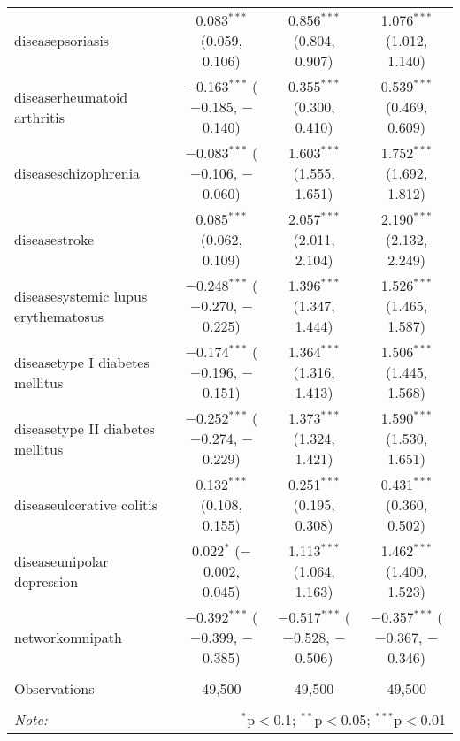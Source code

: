 \begin{table}[!htbp]
\begin{tabular}{@{\extracolsep{5pt}}lccc}
  diseasepsoriasis & 0.083$^{***}$ (0.059, 0.106) & 0.856$^{***}$ (0.804, 0.907) & 1.076$^{***}$ (1.012, 1.140) \\ 
  diseaserheumatoid arthritis & $-$0.163$^{***}$ ($-$0.185, $-$0.140) & 0.355$^{***}$ (0.300, 0.410) & 0.539$^{***}$ (0.469, 0.609) \\ 
  diseaseschizophrenia & $-$0.083$^{***}$ ($-$0.106, $-$0.060) & 1.603$^{***}$ (1.555, 1.651) & 1.752$^{***}$ (1.692, 1.812) \\ 
  diseasestroke & 0.085$^{***}$ (0.062, 0.109) & 2.057$^{***}$ (2.011, 2.104) & 2.190$^{***}$ (2.132, 2.249) \\ 
  diseasesystemic lupus erythematosus & $-$0.248$^{***}$ ($-$0.270, $-$0.225) & 1.396$^{***}$ (1.347, 1.444) & 1.526$^{***}$ (1.465, 1.587) \\ 
  diseasetype I diabetes mellitus & $-$0.174$^{***}$ ($-$0.196, $-$0.151) & 1.364$^{***}$ (1.316, 1.413) & 1.506$^{***}$ (1.445, 1.568) \\ 
  diseasetype II diabetes mellitus & $-$0.252$^{***}$ ($-$0.274, $-$0.229) & 1.373$^{***}$ (1.324, 1.421) & 1.590$^{***}$ (1.530, 1.651) \\ 
  diseaseulcerative colitis & 0.132$^{***}$ (0.108, 0.155) & 0.251$^{***}$ (0.195, 0.308) & 0.431$^{***}$ (0.360, 0.502) \\ 
  diseaseunipolar depression & 0.022$^{*}$ ($-$0.002, 0.045) & 1.113$^{***}$ (1.064, 1.163) & 1.462$^{***}$ (1.400, 1.523) \\ 
  networkomnipath & $-$0.392$^{***}$ ($-$0.399, $-$0.385) & $-$0.517$^{***}$ ($-$0.528, $-$0.506) & $-$0.357$^{***}$ ($-$0.367, $-$0.346) \\ 
 \hline \\[-1.8ex] 
Observations & 49,500 & 49,500 & 49,500 \\ 
\hline 
\hline \\[-1.8ex] 
\textit{Note:}  & \multicolumn{3}{r}{$^{*}$p$<$0.1; $^{**}$p$<$0.05; $^{***}$p$<$0.01} \\ 
\end{tabular} 
\end{table} 
